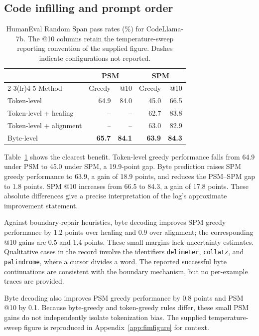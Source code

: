 \documentclass{article}
\begin{document}
\subsection{Code infilling and prompt order}
\label{sec:fim}
\begin{table}[t]
\caption{HumanEval Random Span pass rates (\%) for CodeLlama-7b. The @10 columns retain the temperature-sweep reporting convention of the supplied figure. Dashes indicate configurations not reported.}
\label{tab:fim}
\centering
\begin{tabular}{lrrrr}
\toprule
 & \multicolumn{2}{c}{PSM} & \multicolumn{2}{c}{SPM}\\
\cmidrule(lr){2-3}\cmidrule(lr){4-5}
Method & Greedy & @10 & Greedy & @10\\
\midrule
Token-level & 64.9 & 84.0 & 45.0 & 66.5\\
Token-level + healing & -- & -- & 62.7 & 83.8\\
Token-level + alignment & -- & -- & 63.0 & 82.9\\
Byte-level & \textbf{65.7} & \textbf{84.1} & \textbf{63.9} & \textbf{84.3}\\
\bottomrule
\end{tabular}
\end{table}

Table~\ref{tab:fim} shows the clearest benefit. Token-level greedy performance falls from 64.9 under PSM to 45.0 under SPM, a 19.9-point gap. Byte prediction raises SPM greedy performance to 63.9, a gain of 18.9 points, and reduces the PSM--SPM gap to 1.8 points. SPM @10 increases from 66.5 to 84.3, a gain of 17.8 points. These absolute differences give a precise interpretation of the log's approximate improvement statement.

Against boundary-repair heuristics, byte decoding improves SPM greedy performance by 1.2 points over healing and 0.9 over alignment; the corresponding @10 gains are 0.5 and 1.4 points. These small margins lack uncertainty estimates. Qualitative cases in the record involve the identifiers \texttt{delimeter}, \texttt{collatz}, and \texttt{palindrome}, where a cursor divides a word. The reported successful byte continuations are consistent with the boundary mechanism, but no per-example traces are provided.

Byte decoding also improves PSM greedy performance by 0.8 points and PSM @10 by 0.1. Because byte-greedy and token-greedy rules differ, these small PSM gains do not independently isolate tokenization bias. The supplied temperature-sweep figure is reproduced in Appendix~\ref{app:fimfigure} for context.
\end{document}
